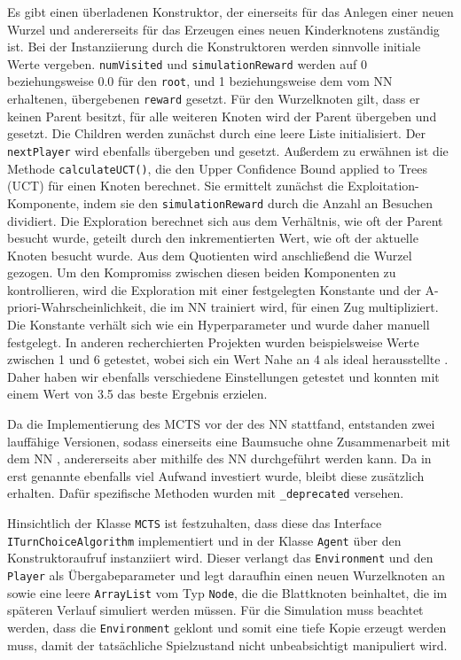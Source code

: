 \documentclass[12pt,a4paper]{article}
\begin{document}
Es gibt einen überladenen Konstruktor, der einerseits für das Anlegen einer neuen Wurzel und andererseits für das Erzeugen eines neuen Kinderknotens zuständig ist. Bei der Instanziierung durch die Konstruktoren werden sinnvolle initiale Werte vergeben. \texttt{numVisited} und \texttt{simulationReward} werden auf 0 beziehungsweise 0.0  für den \texttt{root}, und 1 beziehungsweise dem vom NN erhaltenen, übergebenen \texttt{reward} gesetzt. Für den Wurzelknoten gilt, dass er keinen Parent besitzt, für alle weiteren Knoten wird der Parent übergeben und gesetzt. Die Children werden zunächst durch eine leere Liste initialisiert. Der \texttt{nextPlayer} wird ebenfalls übergeben und gesetzt. Außerdem zu erwähnen ist die Methode \texttt{calculateUCT()}, die den Upper Confidence Bound applied to Trees (UCT) für einen Knoten berechnet. Sie ermittelt zunächst die Exploitation-Komponente, indem sie den \texttt{simulationReward} durch die Anzahl an Besuchen dividiert. Die Exploration berechnet sich aus dem Verhältnis, wie oft der Parent besucht wurde, geteilt durch den inkrementierten Wert, wie oft der aktuelle Knoten besucht wurde. Aus dem Quotienten wird anschließend die Wurzel gezogen. Um den Kompromiss zwischen diesen beiden Komponenten zu kontrollieren, wird die Exploration mit einer festgelegten Konstante und der A-priori-Wahrscheinlichkeit, die im NN trainiert wird, für einen Zug multipliziert. Die Konstante verhält sich wie ein Hyperparameter und wurde daher manuell festgelegt. In anderen recherchierten Projekten wurden beispielsweise Werte zwischen 1 und 6 getestet, wobei sich ein Wert Nahe an 4 als ideal herausstellte \cite{MediumPart3}. Daher haben wir ebenfalls verschiedene Einstellungen getestet und konnten mit einem Wert von 3.5 das beste Ergebnis erzielen.

Da die Implementierung des MCTS vor der des NN stattfand, entstanden zwei lauffähige Versionen, sodass einerseits eine Baumsuche ohne Zusammenarbeit mit dem NN , andererseits aber mithilfe des NN durchgeführt werden kann. Da in erst genannte ebenfalls viel Aufwand investiert wurde, bleibt diese zusätzlich erhalten. Dafür spezifische Methoden wurden mit \glqq{}\texttt{\_deprecated}\grqq{} versehen.

Hinsichtlich der Klasse \texttt{MCTS} ist festzuhalten, dass diese das Interface \texttt{ITurnChoiceAlgorithm} implementiert und in der Klasse \texttt{Agent} über den Konstruktoraufruf instanziiert wird. Dieser verlangt das \texttt{Environment} und den \texttt{Player} als Übergabeparameter und legt daraufhin einen neuen Wurzelknoten an sowie eine leere \texttt{ArrayList} vom Typ \texttt{Node}, die die Blattknoten beinhaltet, die im späteren Verlauf simuliert werden müssen. Für die Simulation muss beachtet werden, dass die \texttt{Environment} geklont und somit eine tiefe Kopie erzeugt werden muss, damit der tatsächliche Spielzustand nicht unbeabsichtigt manipuliert wird. 
\end{document}
